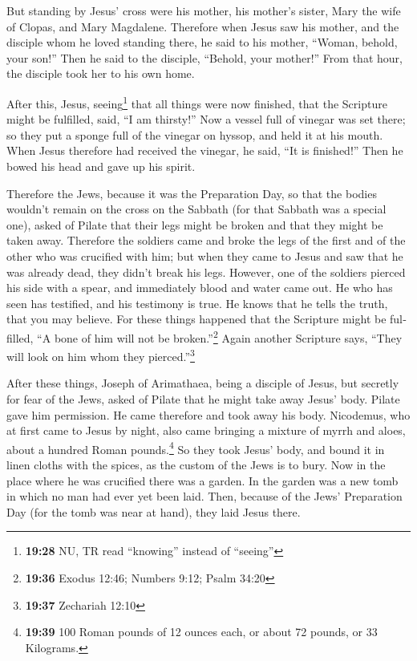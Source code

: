 \begin{paracol}{2}
\begin{otherlanguage}{english}
 But standing by Jesus' cross were his mother, his
mother's sister, Mary the wife of Clopas, and Mary Magdalene.
 Therefore when Jesus saw his mother, and the disciple
whom he loved standing there, he said to his mother, ``Woman, behold,
your son!''  Then he said to the disciple, ``Behold, your
mother!'' From that hour, the disciple took her to his own home.

 After this, Jesus, seeing\footnote{\textbf{19:28} NU, TR
  read ``knowing'' instead of ``seeing''} that all things were now
finished, that the Scripture might be fulfilled, said, ``I am thirsty!''
 Now a vessel full of vinegar was set there; so they put
a sponge full of the vinegar on hyssop, and held it at his mouth.
 When Jesus therefore had received the vinegar, he said,
``It is finished!'' Then he bowed his head and gave up his spirit.

 Therefore the Jews, because it was the Preparation Day,
so that the bodies wouldn't remain on the cross on the Sabbath (for that
Sabbath was a special one), asked of Pilate that their legs might be
broken and that they might be taken away.  Therefore the
soldiers came and broke the legs of the first and of the other who was
crucified with him;  but when they came to Jesus and saw
that he was already dead, they didn't break his legs. 
However, one of the soldiers pierced his side with a spear, and
immediately blood and water came out.  He who has seen
has testified, and his testimony is true. He knows that he tells the
truth, that you may believe.  For these things happened
that the Scripture might be fulfilled, ``A bone of him will not be
broken.''\footnote{\textbf{19:36} Exodus 12:46; Numbers 9:12; Psalm
  34:20}  Again another Scripture says, ``They will look
on him whom they pierced.''\footnote{\textbf{19:37} Zechariah 12:10}

 After these things, Joseph of Arimathaea, being a
disciple of Jesus, but secretly for fear of the Jews, asked of Pilate
that he might take away Jesus' body. Pilate gave him permission. He came
therefore and took away his body.  Nicodemus, who at
first came to Jesus by night, also came bringing a mixture of myrrh and
aloes, about a hundred Roman pounds.\footnote{\textbf{19:39} 100 Roman
  pounds of 12 ounces each, or about 72 pounds, or 33 Kilograms.}
 So they took Jesus' body, and bound it in linen cloths
with the spices, as the custom of the Jews is to bury. 
Now in the place where he was crucified there was a garden. In the
garden was a new tomb in which no man had ever yet been laid.
 Then, because of the Jews' Preparation Day (for the tomb
was near at hand), they laid Jesus there.


\end{otherlanguage}
\end{paracol}
